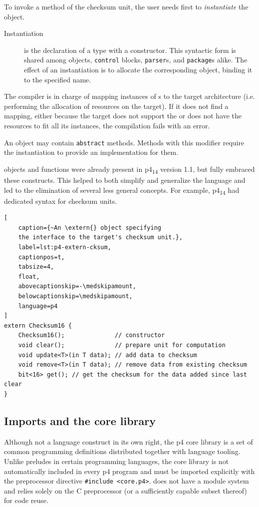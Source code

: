 To invoke a method of the checksum unit, the user needs first to
\emph{instantiate} the \extern{} object.

\begin{description}
	\item[Instantiation] is the declaration of a type with a constructor. This
	syntactic form is shared among \extern{} objects, \texttt{control} blocks,
	\texttt{parser}s, and \texttt{package}s alike. The effect of an
	instantiation is to allocate the corresponding object, binding it to the
	specified name.
\end{description}

The compiler is in charge of mapping instances of \extern{}s to the target
architecture (i.e. performing the allocation of resources on the target). If it
does not find a mapping, either because the target does not support the
\extern{} or does not have the resources to fit all its instances, the
compilation fails with an error.

An \extern{} object may contain \texttt{abstract} methods. Methods with this
modifier require the \extern{} instantiation to provide an implementation for
them.

\extern{} objects and functions were already present in
\acrshort{p4}\textsubscript{14} version 1.1, but \pfs fully embraced these
constructs. This helped to both simplify and generalize the language and led to
the elimination of several less general concepts. For example,
\acrshort{p4}\textsubscript{14} had dedicated syntax for checksum units.

\begin{lstlisting}[
	caption={~An \extern{} object specifying
	the interface to the target's checksum unit.},
	label=lst:p4-extern-cksum,
	captionpos=t,
	tabsize=4,
	float,
	abovecaptionskip=-\medskipamount,
	belowcaptionskip=\medskipamount,
	language=p4
]
extern Checksum16 {
	Checksum16();              // constructor
	void clear();              // prepare unit for computation
	void update<T>(in T data); // add data to checksum
	void remove<T>(in T data); // remove data from existing checksum
	bit<16> get(); // get the checksum for the data added since last clear
}
\end{lstlisting}

\subsection*{Imports and the core library}

Although not a language construct in its own right, the \acrshort{p4} core
library is a set of common programming definitions distributed together with
language tooling. Unlike preludes in certain programming languages, the core
library is not automatically included in every \acrshort{p4} program and must be
imported explicitly with the preprocessor directive \texttt{\#include
<core.p4>}. \pfs does not have a module system and relies solely on the C
preprocessor (or a sufficiently capable subset thereof) for code reuse.

